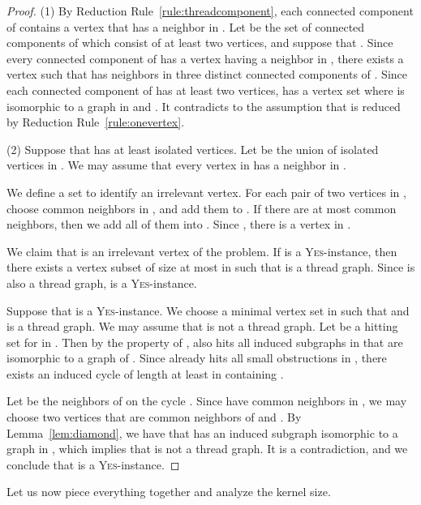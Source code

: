 \documentclass[11pt]{article}
\theoremstyle{remark}
\begin{document}
\begin{proof}
(1) By Reduction Rule~\ref{rule:threadcomponent}, 
each connected component  of  contains a vertex that has a neighbor in .
Let  be the set of connected components of  which consist of at least two vertices, and suppose that .
Since every connected component of  has a vertex having a neighbor in , 
there exists a vertex  such that  has neighbors in three distinct connected components of .
Since each connected component of  has at least two vertices, 
 has a vertex set  where  is isomorphic to a graph in  and . It contradicts to the assumption that  is reduced
by Reduction Rule~\ref{rule:onevertex}.

\medskip
(2) Suppose that  has at least  isolated vertices.
Let  be the union of isolated vertices in . 
We may assume that every vertex in  has a neighbor in . 
 
We define a set  to identify an irrelevant vertex.
For each pair of two vertices in , choose  common neighbors in , and add them to . If there are at most  common neighbors, then we add all of them into .
Since , there is a vertex  in .

 We claim that  is an irrelevant vertex of the problem. 
 If  is a \textsc{Yes}-instance,
 then there exists a vertex subset  of size at most  in  such that  is a thread graph.
 Since  is also a thread graph,  is a \textsc{Yes}-instance.
 
 Suppose that  is a \textsc{Yes}-instance.
 We choose a minimal vertex set  in  such that  and  is a thread graph.
 We may assume that  is not a thread graph.
 Let  be a hitting set for  in .
 Then by the property of ,  also hits all induced subgraphs in  that are isomorphic to a graph of .
 Since  already hits all small obstructions in ,
 there exists an induced cycle  of length at least  in  containing .


 
 Let  be the neighbors of  on the cycle .
 Since  have  common neighbors in , 
 we may choose two vertices  that are common neighbors of  and .
 By Lemma~\ref{lem:diamond}, we have that  has an induced subgraph isomorphic to a graph in ,
 which implies that  is not a thread graph. 
 It is a contradiction, and we conclude that  is a \textsc{Yes}-instance.
\end{proof}


Let us now piece everything together and analyze the kernel size.
\end{document}
